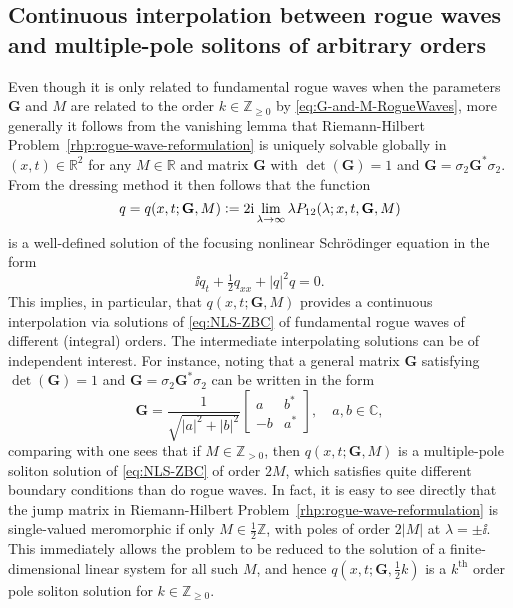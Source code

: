 \subsection{Continuous interpolation between rogue waves and multiple-pole solitons of arbitrary orders}
\label{sec:M-arbitrary}
Even though it is only related to fundamental rogue waves when the parameters $\mathbf{G}$ and $M$ are related to the order $k\in\mathbb{Z}_{\ge 0}$ by \eqref{eq:G-and-M-RogueWaves}, more generally it follows from the vanishing lemma \cite{Zhou89} that Riemann-Hilbert Problem~\ref{rhp:rogue-wave-reformulation} is uniquely solvable globally in $(x,t)\in\mathbb{R}^2$ for any $M\in\mathbb{R}$ and matrix $\mathbf{G}$ with $\det(\mathbf{G})=1$ and $\mathbf{G}=\sigma_2\mathbf{G}^*\sigma_2$.  From the dressing method it then follows that the function 
\begin{equation}
q=q(x,t;\mathbf{G},M)\vcentcolon= 2\mathrm{i}\lim_{\lambda\to\infty}\lambda P_{12}(\lambda;x,t,\mathbf{G},M)
\label{eq:q-define}
\end{equation}
is a well-defined solution of the focusing nonlinear Schr\"odinger equation in the form
\begin{equation}
\ii q_t+\tfrac{1}{2}q_{xx}+|q|^2q=0.
\label{eq:NLS-ZBC}
\end{equation}
This implies, in particular, that $q(x,t;\mathbf{G},M)$ provides a continuous interpolation via solutions of \eqref{eq:NLS-ZBC} of fundamental rogue waves of different (integral) orders.  The intermediate interpolating solutions can be of independent interest.
For instance, noting that a general matrix $\mathbf{G}$ satisfying $\det(\mathbf{G})=1$ and $\mathbf{G}=\sigma_2\mathbf{G}^*\sigma_2$ can be written in the form
\begin{equation}
\mathbf{G}=\frac{1}{\sqrt{|a|^2+|b|^2}}\begin{bmatrix}a & b^*\\-b & a^*\end{bmatrix},\quad a,b\in\mathbb{C},
\label{eq:G-form}
\end{equation}
comparing with \cite{BilmanBW19} one sees that if $M\in\mathbb{Z}_{>0}$, then $q(x,t;\mathbf{G},M)$ is a multiple-pole soliton solution of \eqref{eq:NLS-ZBC} of order $2M$, which satisfies quite different boundary conditions than do rogue waves.  In fact, it is easy to see directly that the jump matrix in Riemann-Hilbert Problem~\ref{rhp:rogue-wave-reformulation} is single-valued meromorphic if only $M\in\tfrac{1}{2}\mathbb{Z}$, with poles of order $2|M|$ at $\lambda=\pm\ii$.  This immediately allows the problem to be reduced to the solution of a finite-dimensional linear system for all such $M$, and hence $q(x,t;\mathbf{G},\tfrac{1}{2}k)$ is a $k^\mathrm{th}$ order pole soliton solution for $k\in\mathbb{Z}_{\ge 0}$.  
